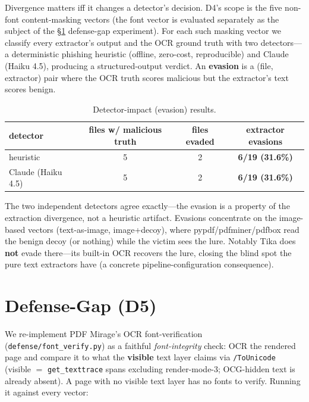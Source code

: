 \documentclass[11pt]{article}
\newcommand{\code}[1]{\texttt{#1}}
\begin{document}
Divergence matters iff it changes a detector's decision. D4's scope is the five
non-font content-masking vectors (the font vector is evaluated separately as the
subject of the \S\ref{sec:defense} defense-gap experiment). For each such
masking vector we classify every extractor's output and the OCR ground truth
with two detectors---a deterministic phishing heuristic (offline, zero-cost,
reproducible) and Claude (Haiku 4.5), producing a structured-output verdict. An
\textbf{evasion} is a (file, extractor) pair where the OCR truth scores malicious
but the extractor's text scores benign.

\begin{table}[h]
\centering
\small
\begin{tabular}{@{}l c c c@{}}
\toprule
detector & files w/ malicious truth & files evaded & extractor evasions \\
\midrule
heuristic & 5 & 2 & \textbf{6/19 (31.6\%)} \\
Claude (Haiku 4.5) & 5 & 2 & \textbf{6/19 (31.6\%)} \\
\bottomrule
\end{tabular}
\caption{Detector-impact (evasion) results.}
\end{table}

The two independent detectors agree exactly---the evasion is a property of the
extraction divergence, not a heuristic artifact. Evasions concentrate on the
image-based vectors (text-as-image, image+decoy), where pypdf/pdfminer/pdfbox
read the benign decoy (or nothing) while the victim sees the lure. Notably Tika
does \textbf{not} evade there---its built-in OCR recovers the lure, closing the
blind spot the pure text extractors have (a concrete pipeline-configuration
consequence).

\section{Defense-Gap (D5)}
\label{sec:defense}

We re-implement PDF Mirage's OCR font-verification
(\code{defense/font\_verify.py}) as a faithful \emph{font-integrity} check: OCR
the rendered page and compare it to what the \textbf{visible} text layer claims
via \code{/ToUnicode} (visible $=$ \code{get\_texttrace} spans excluding
render-mode-3; OCG-hidden text is already absent). A page with no visible text
layer has no fonts to verify. Running it against every vector:
\end{document}
